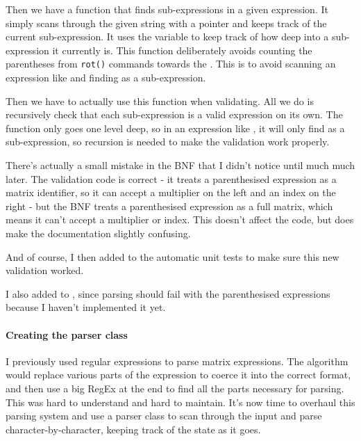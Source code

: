 \documentclass[../development.tex]{subfiles}
\begin{document}
Then we have a function that finds sub-expressions in a given expression. It simply scans through the given string with a pointer and keeps track of the current sub-expression. It uses the  variable to keep track of how deep into a sub-expression it currently is. This function deliberately avoids counting the parentheses from \texttt{rot()} commands towards the . This is to avoid scanning an expression like  and finding  as a sub-expression.

Then we have to actually use this function when validating. All we do is recursively check that each sub-expression is a valid expression on its own. The  function only goes one level deep, so in an expression like , it will only find  as a sub-expression, so recursion is needed to make the validation work properly.

There's actually a small mistake in the BNF that I didn't notice until much much later. The validation code is correct - it treats a parenthesised expression as a matrix identifier, so it can accept a multiplier on the left and an index on the right - but the BNF treats a parenthesised expression as a full matrix, which means it can't accept a multiplier or index. This doesn't affect the code, but does make the documentation slightly confusing.

And of course, I then added to the automatic unit tests to make sure this new validation worked.


I also added  to , since parsing should fail with the parenthesised expressions because I haven't implemented it yet.


\paragraph{Creating the parser class\label{development:making-v0.2.2:parsing-parentheses:creating-the-parser-class}}

I previously used regular expressions to parse matrix expressions. The algorithm would replace various parts of the expression to coerce it into the correct format, and then use a big RegEx at the end to find all the parts necessary for parsing. This was hard to understand and hard to maintain. It's now time to overhaul this parsing system and use a parser class to scan through the input and parse character-by-character, keeping track of the state as it goes.
\end{document}
